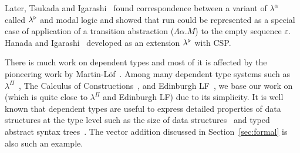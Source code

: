 Later, Tsukada and Igarashi~\cite{TsukadaIgarashi2010Logical} found correspondence
between a variant of \(\lambda^\alpha\) called $\lambda^{\mathop{\triangleright}}$
and modal logic and showed that run could be represented as a special
case of application of a transition abstraction ($\Lambda\alpha.M$) to
the empty sequence $\varepsilon$.  Hanada and
Igarashi~\cite{Hanada2014} developed \LTP as an extension
$\lambda^{\mathop{\triangleright}}$ with CSP.


There is much work on dependent types and most of it is affected by
the pioneering work by Martin-L\"{o}f~\cite{martin1973intuitionistic}.
Among many dependent type systems such as
$\lambda^\Pi$~\cite{Meyer1986}, The Calculus of
Constructions~\cite{coquand:inria-00076024}, and Edinburgh
LF~\cite{harper1993framework}, we base our work on \LLF~\cite{attapl}
(which is quite close to $\lambda^\Pi$ and Edinburgh LF) due to its
simplicity.  It is well known that dependent types are useful to
express detailed properties of data structures at the type level such
as the size of data structures~\cite{Xi98} and typed abstract syntax
trees~\cite{DBLP:conf/dsl/LeijenM99,DBLP:conf/popl/XiCC03}.  The
vector addition discussed in Section~\ref{sec:formal} is also such an
example.






